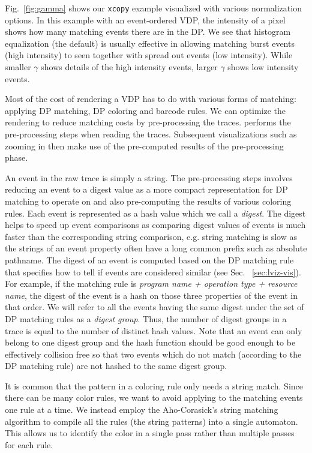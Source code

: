 Fig.~\ref{fig:gamma} shows our {\tt xcopy} example visualized
with various normalization options.
In this example with an event-ordered VDP,
the intensity of a pixel shows how many matching events there are in the DP.
We see that histogram equalization (the default) is usually effective
in allowing matching burst events (high intensity) to seen together
with spread out events (low intensity).
While smaller $\gamma$ shows details of the high intensity events,
larger $\gamma$ shows low intensity events.

Most of the cost of rendering a VDP has to do with various forms of
matching: applying DP matching, DP coloring and barcode rules.
We can optimize the rendering to reduce matching costs by pre-processing
the traces.  performs the pre-processing steps when reading the
traces. Subsequent visualizations such as zooming in then make use of
the pre-computed results of the pre-processing phase.

An event in the raw trace is simply a string.
The pre-processing steps involves reducing an event to
a digest value as a more compact representation for DP matching
to operate on and also pre-computing the
results of various coloring rules.
Each event is represented as a hash value which we call a {\em digest}.
The digest helps to speed up event comparisons
as comparing digest values of events is much faster than
the corresponding string comparison, e.g. string matching is slow
as the strings of an event property often have a long common prefix such
as absolute pathname.
The digest of an event is computed based on the DP matching rule that specifies
how to tell if events are considered similar (see Sec. ~\ref{sec:lviz-vis}).
For example, if the matching rule is 
{\em program name + operation type + resource name}, the digest
of the event is a hash on those three properties of the event in that order.
We will refer to all the events having the same digest under
the set of DP matching rules as a {\em digest group}.
Thus, the number of digest groups in a trace is equal to the number of distinct hash values.
Note that an event can only belong to one digest group and the hash function
should be good enough to be effectively collision free so that 
two events which do not match (according to the DP matching rule) are
not hashed to the same digest group.

It is common that the pattern in a coloring rule only needs a string
match.
Since there can be many color rules, we want to avoid applying
to the matching events one rule at a time.
We instead employ the Aho-Corasick's string matching algorithm \cite{aho1975efficient}
to compile all the rules (the string patterns) into a single automaton.
This allows us to identify the color in a single pass
rather than multiple passes for each rule.

